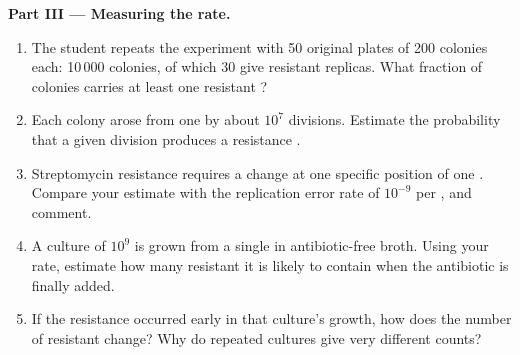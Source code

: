 \begin{problem}
\medskip
\noindent\textbf{Part III --- Measuring the rate.}
\begin{enumerate}[resume]
  \item The student repeats the experiment with 50 original plates of
        200 colonies each: 10\,000 colonies, of which 30 give
        resistant replicas. What fraction of colonies carries at
        least one resistant ?
  \item Each colony arose from one  by about $10^7$ 
        divisions. Estimate the probability that a given division
        produces a resistance .
  \item Streptomycin resistance requires a change at one specific
        position of one . Compare your estimate with the
        replication error rate of $10^{-9}$ per , and
        comment.
  \item A culture of $10^9$  is grown from a single  in
        antibiotic-free broth. Using your rate, estimate how many
        resistant  it is likely to contain when the antibiotic
        is finally added.
  \item If the resistance  occurred early in that culture's
        growth, how does the number of resistant  change? Why do
        repeated cultures give very different counts?
\end{enumerate}


\end{problem}
